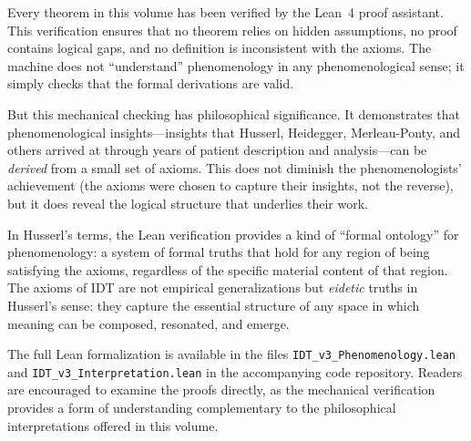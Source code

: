 \begin{interpretation}
\label{interp:lean-verification}
Every theorem in this volume has been verified by the Lean~4 proof assistant.
This verification ensures that no theorem relies on hidden assumptions, no proof
contains logical gaps, and no definition is inconsistent with the axioms.  The
machine does not ``understand'' phenomenology in any phenomenological sense;
it simply checks that the formal derivations are valid.

But this mechanical checking has philosophical significance.  It demonstrates
that phenomenological insights---insights that Husserl, Heidegger, Merleau-Ponty,
and others arrived at through years of patient description and analysis---can
be \emph{derived} from a small set of axioms.  This does not diminish the
phenomenologists' achievement (the axioms were chosen to capture their insights,
not the reverse), but it does reveal the logical structure that underlies their
work.

In Husserl's terms, the Lean verification provides a kind of ``formal ontology''
for phenomenology: a system of formal truths that hold for any region of being
satisfying the axioms, regardless of the specific material content of that region.
The axioms of IDT are not empirical generalizations but \emph{eidetic} truths in
Husserl's sense: they capture the essential structure of any space in which
meaning can be composed, resonated, and emerge.

The full Lean formalization is available in the files
\texttt{IDT\_v3\_Phenomenology.lean} and \texttt{IDT\_v3\_Interpretation.lean}
in the accompanying code repository.  Readers are encouraged to examine the
proofs directly, as the mechanical verification provides a form of understanding
complementary to the philosophical interpretations offered in this volume.
\end{interpretation}

